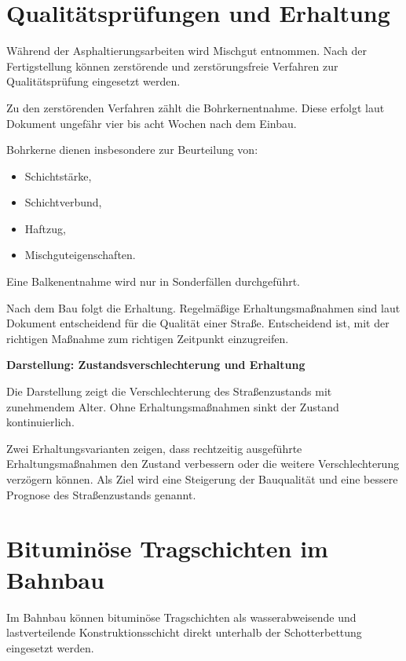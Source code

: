 \documentclass[
  12pt,
  a4paper,
  oneside
]{scrreprt}
\begin{document}
\section{Qualitätsprüfungen und Erhaltung}

Während der Asphaltierungsarbeiten wird Mischgut entnommen. Nach der
Fertigstellung können zerstörende und zerstörungsfreie Verfahren zur
Qualitätsprüfung eingesetzt werden.


Zu den zerstörenden Verfahren zählt die Bohrkernentnahme. Diese erfolgt
laut Dokument ungefähr vier bis acht Wochen nach dem Einbau.


Bohrkerne dienen insbesondere zur Beurteilung von:

\begin{itemize}
  \item Schichtstärke,
  \item Schichtverbund,
  \item Haftzug,
  \item Mischguteigenschaften.
\end{itemize}



Eine Balkenentnahme wird nur in Sonderfällen durchgeführt.


Nach dem Bau folgt die Erhaltung. Regelmäßige Erhaltungsmaßnahmen sind
laut Dokument entscheidend für die Qualität einer Straße. Entscheidend
ist, mit der richtigen Maßnahme zum richtigen Zeitpunkt einzugreifen.


\begin{darstellungsbox}
\textbf{Darstellung: Zustandsverschlechterung und Erhaltung}

Die Darstellung zeigt die Verschlechterung des Straßenzustands mit
zunehmendem Alter. Ohne Erhaltungsmaßnahmen sinkt der Zustand
kontinuierlich.

Zwei Erhaltungsvarianten zeigen, dass rechtzeitig ausgeführte
Erhaltungsmaßnahmen den Zustand verbessern oder die weitere
Verschlechterung verzögern können. Als Ziel wird eine Steigerung der
Bauqualität und eine bessere Prognose des Straßenzustands genannt.
\end{darstellungsbox}

\section{Bituminöse Tragschichten im Bahnbau}

Im Bahnbau können bituminöse Tragschichten als wasserabweisende und
lastverteilende Konstruktionsschicht direkt unterhalb der
Schotterbettung eingesetzt werden.
\end{document}
